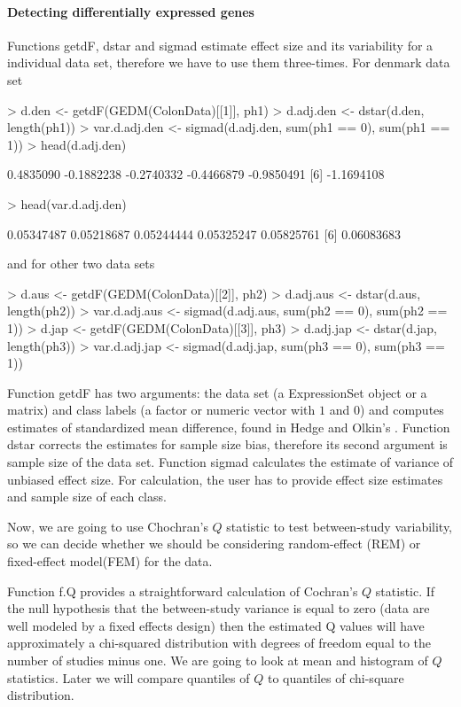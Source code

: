 \documentclass[a4paper]{report}
\begin{document}
\paragraph{Detecting differentially expressed genes}
Functions {\ttfamily getdF}, {\ttfamily dstar} and {\ttfamily sigmad} estimate effect size and its variability for a individual data set, therefore we have to use them three-times. For {\ttfamily denmark} data set  
\begin{Schunk}
\begin{Sinput}
> d.den <- getdF(GEDM(ColonData)[[1]], ph1)
> d.adj.den <- dstar(d.den, length(ph1))
> var.d.adj.den <- sigmad(d.adj.den, sum(ph1 == 0), sum(ph1 == 1))
> head(d.adj.den)
\end{Sinput}
\begin{Soutput}
[1]  0.4835090 -0.1882238 -0.2740332 -0.4466879 -0.9850491
[6] -1.1694108
\end{Soutput}
\begin{Sinput}
> head(var.d.adj.den)
\end{Sinput}
\begin{Soutput}
[1] 0.05347487 0.05218687 0.05244444 0.05325247 0.05825761
[6] 0.06083683
\end{Soutput}
\end{Schunk}
and for other two data sets 
\begin{Schunk}
\begin{Sinput}
> d.aus <- getdF(GEDM(ColonData)[[2]], ph2)
> d.adj.aus <- dstar(d.aus, length(ph2))
> var.d.adj.aus <- sigmad(d.adj.aus, sum(ph2 == 0), sum(ph2 == 1))
> d.jap <- getdF(GEDM(ColonData)[[3]], ph3)
> d.adj.jap <- dstar(d.jap, length(ph3))
> var.d.adj.jap <- sigmad(d.adj.jap, sum(ph3 == 0), sum(ph3 == 1))
\end{Sinput}
\end{Schunk}
Function {\ttfamily getdF} has two arguments: the data set (a ExpressionSet object or a matrix) and class labels (a factor or numeric vector with $1$ and $0$) and computes estimates of standardized mean difference, found in Hedge and Olkin's \cite{Hedges}. Function {\ttfamily dstar} corrects the estimates for sample size bias, therefore its second argument is sample size of the data set. Function {\ttfamily sigmad} calculates the estimate of variance of unbiased effect size. For calculation, the user has to provide effect size estimates and sample size of each class. \par
Now, we are going to use Chochran's $Q$ statistic \cite{Cochran} to test between-study variability, so we can decide whether we should be considering random-effect (REM) or fixed-effect model(FEM) for the data. \par
Function {\ttfamily f.Q} provides a straightforward calculation of Cochran's $Q$ statistic. If the null hypothesis that the between-study variance is equal to zero (data are well modeled by a fixed effects design) then the estimated Q values will have approximately a chi-squared distribution with degrees of freedom equal to the number of studies minus one. We are going to look at mean and histogram of $Q$ statistics. Later we will compare quantiles of $Q$ to quantiles of chi-square distribution.  
\end{document}
